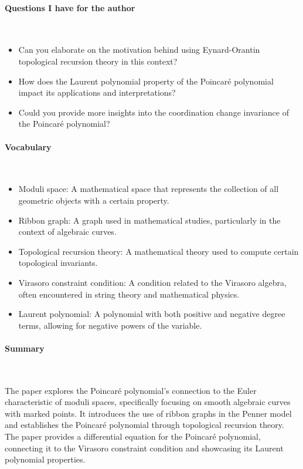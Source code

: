 \vspace*{-0.5cm}
\paragraph{Questions I have for the author} \ 

\begin{itemize}
    \item Can you elaborate on the motivation behind using Eynard-Orantin topological recursion theory in this context?
    \item How does the Laurent polynomial property of the Poincaré polynomial impact its applications and interpretations?
    \item Could you provide more insights into the coordination change invariance of the Poincaré polynomial?
\end{itemize}

\vspace{-0.5cm}
\paragraph{Vocabulary} \ 

\begin{itemize}
\item Moduli space: A mathematical space that represents the collection of all geometric objects with a certain property.
\item Ribbon graph: A graph used in mathematical studies, particularly in the context of algebraic curves.
\item Topological recursion theory: A mathematical theory used to compute certain topological invariants.
\item Virasoro constraint condition: A condition related to the Virasoro algebra, often encountered in string theory and mathematical physics.
\item Laurent polynomial: A polynomial with both positive and negative degree terms, allowing for negative powers of the variable.
\end{itemize}

\vspace*{-0.5cm}
\paragraph{Summary} \

The paper explores the Poincaré polynomial's connection to the Euler characteristic of moduli spaces, specifically focusing on smooth algebraic curves with marked points. It introduces the use of ribbon graphs in the Penner model and establishes the Poincaré polynomial through topological recursion theory. The paper provides a differential equation for the Poincaré polynomial, connecting it to the Virasoro constraint condition and showcasing its Laurent polynomial properties.

